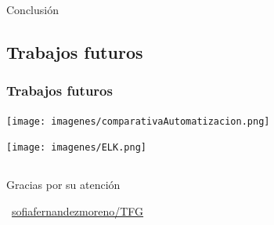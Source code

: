 \documentclass{beamer}
\theoremstyle{plain}
\theoremstyle{definition}
\theoremstyle{plain}
\theoremstyle{definition}
\theoremstyle{remark}
\theoremstyle{definition}
\begin{document}
\begin{frame}
	
	\Huge{\centerline{Conclusión}}
	
\end{frame}
\subsection{Trabajos futuros}
\begin{frame}
	\frametitle{Trabajos futuros}
	\centering
	\texttt{[image: imagenes/comparativaAutomatizacion.png]}
	
	\texttt{[image: imagenes/ELK.png]}
\end{frame}
\subsection{}
\begin{frame}{}{}
	\Huge{\centerline{Gracias por su atención}}
	\centerline{\Huge{\raisebox{-.25\height}\faGithub}~\large{\href{https://github.com/sofiafernandezmoreno/TFG}{\alert{sofiafernandezmoreno/TFG}}}}

\end{frame}
\end{document}

